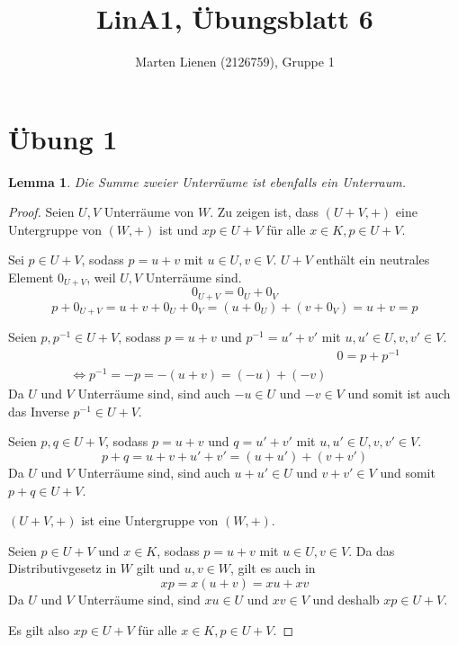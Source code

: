 \documentclass[a4paper,10pt]{article}
\title{LinA1, Übungsblatt 6}
\author{Marten Lienen (2126759), Gruppe 1}
\newtheorem{lemma}{Lemma}
\begin{document}
\maketitle

\section*{Übung 1}

\begin{lemma}
 Die Summe zweier Unterräume ist ebenfalls ein Unterraum.
\end{lemma}

\begin{proof}
 Seien $U, V$ Unterräume von $W$.
 Zu zeigen ist, dass $(U + V, +)$ eine Untergruppe von $(W, +)$ ist und $xp \in U + V$ für alle $x \in K, p \in U + V$.
 
 Sei $p \in U + V$, sodass $p = u + v$ mit $u \in U, v \in V$.
 $U + V$ enthält ein neutrales Element $0_{U + V}$, weil $U, V$ Unterräume sind.
 \begin{equation}
  0_{U + V} = 0_U + 0_V
 \end{equation}
 \begin{equation}
  p + 0_{U + V} = u + v + 0_U + 0_V = (u + 0_U) + (v + 0_V) = u + v = p
 \end{equation}
 
 Seien $p, p^{-1} \in U + V$, sodass $p = u + v$ und $p^{-1} = u' + v'$ mit $u, u' \in U, v, v' \in V$.
 \begin{align}
  & 0 = p + p^{-1}\\
  \Leftrightarrow p^{-1} = -p = -(u + v) = (-u) + (-v)
 \end{align}
 Da $U$ und $V$ Unterräume sind, sind auch $-u \in U$ und $-v \in V$ und somit ist auch das Inverse $p^{-1} \in U + V$.
 
 Seien $p, q \in U + V$, sodass $p = u + v$ und $q = u' + v'$ mit $u, u' \in U, v, v' \in V$.
 \begin{equation}
  p + q = u + v + u' + v' = (u + u') + (v + v')
 \end{equation}
 Da $U$ und $V$ Unterräume sind, sind auch $u + u' \in U$ und $v + v' \in V$ und somit $p + q \in U + V$.
 
 $(U + V, +)$ ist eine Untergruppe von $(W, +)$.
 
 Seien $p \in U + V$ und $x \in K$, sodass $p = u + v$ mit $u \in U, v \in V$.
 Da das Distributivgesetz in $W$ gilt und $u, v \in W$, gilt es auch in
 \begin{equation}
  xp = x(u + v) = xu + xv
 \end{equation}
 Da $U$ und $V$ Unterräume sind, sind $xu \in U$ und $xv \in V$ und deshalb $xp \in U + V$.
 
 Es gilt also $xp \in U + V$ für alle $x \in K, p \in U + V$.
\end{proof}
\end{document}
